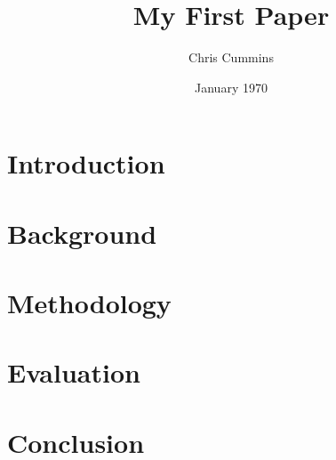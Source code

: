 
\author{Chris Cummins}

\date{January 1970}

\title{My First Paper}



\section{Introduction}\label{sec:introduction}


\section{Background}\label{sec:background}


\section{Methodology}\label{sec:methodology}


\section{Evaluation}\label{sec:evaluation}


\section{Conclusion}\label{sec:conclusions}



